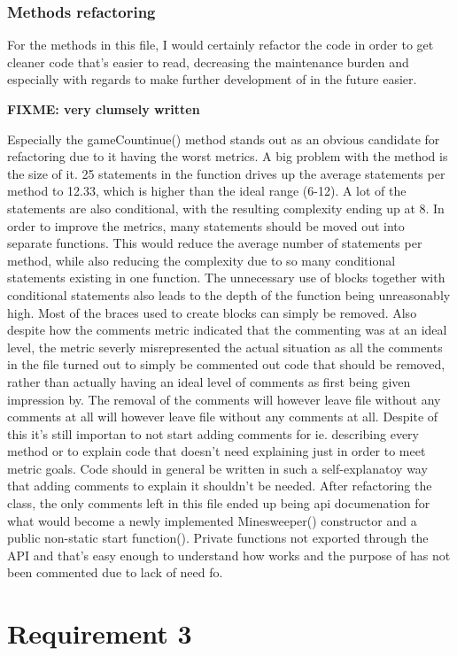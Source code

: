 \documentclass[UKenglish]{article}  %
\begin{document}
\subsubsection{Methods refactoring}
For the methods in this file, I would certainly refactor the code in order
to get cleaner code that's easier to read, decreasing the maintenance burden
and especially with regards to make further development of in the future
easier.

\textbf{FIXME: very clumsely written}

Especially the gameCountinue() method stands out as an obvious candidate for
refactoring due to it having the worst metrics.
A big problem with the method is the size of it. 25 statements in the function
drives up the average statements per method to 12.33, which is higher than the
ideal range (6-12).
A lot of the statements are also conditional, with the resulting complexity
ending up at 8.
In order to improve the metrics, many statements should be moved out into
separate functions. This would reduce the average number of statements per
method, while also reducing the complexity due to so many conditional
statements existing in one function.
The unnecessary use of blocks together with conditional statements also leads
to the depth of the function being unreasonably high.
Most of the braces used to create blocks can simply be removed.
Also despite how the comments metric indicated that the commenting was at an
ideal level, the metric severly misrepresented the actual situation as all
the comments in the file turned out to simply be commented out code that
should be removed, rather than actually having an ideal level of comments
as first being given impression by.
The removal of the comments will however leave file without any comments at
all will however leave file without any comments at all. Despite of this
it's still importan to not start adding comments for ie. describing every
method or to explain code that doesn't need explaining just in order to
meet metric goals.
Code should in general be written in such a self-explanatoy way that adding
comments to explain it shouldn't be needed.
After refactoring the class, the only comments left in this file ended up
being api documenation for what would become a newly implemented Minesweeper()
constructor and a public non-static start function().
Private functions not exported through the API and that's easy enough to
understand how works and the purpose of has not been commented due to lack
of need fo.

\section{Requirement 3}
\end{document}
